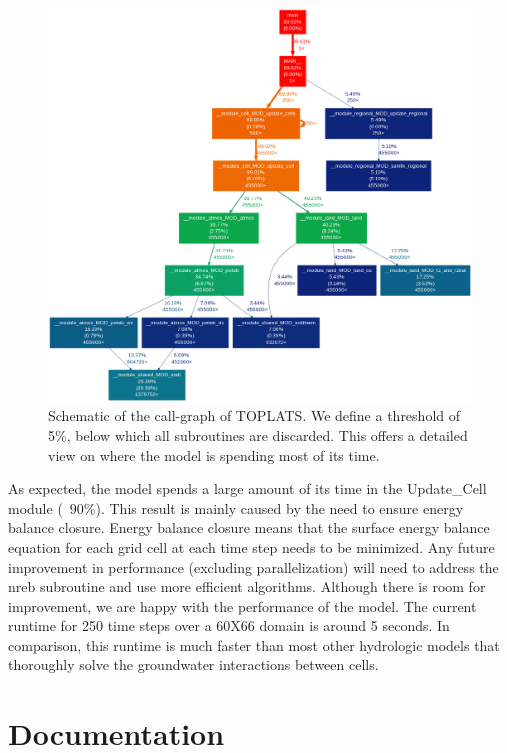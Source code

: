 \documentclass[pdftex,12pt,a4paper]{article}
\begin{document}
\begin{figure}[h]
	\includegraphics[width=5.0in]{Figures/CallGraph.png}

	\caption{Schematic of the call-graph of TOPLATS. We define a threshold of 5\%, below which all subroutines are discarded. This offers a detailed view on where the model is spending most of its time.}
	\label{Profiling1}
\end{figure}

\vspace{1em}

As expected, the model spends a large amount of its time in the Update\_Cell module (~90\%). This result is mainly caused by the need to ensure energy balance closure. Energy balance closure means that the surface energy balance equation for each grid cell at each time step needs to be minimized. Any future improvement in performance (excluding parallelization) will need to address the nreb subroutine and use more efficient algorithms. Although there is room for improvement, we are happy with the performance of the model. The current runtime for 250 time steps over a 60X66 domain is around 5 seconds. In comparison, this runtime is much faster than most other hydrologic models that thoroughly solve the groundwater interactions between cells.

\section{Documentation}
\end{document}
